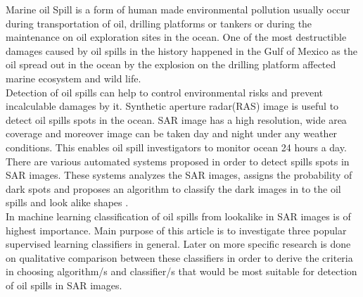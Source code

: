 Marine oil Spill is a form of human made environmental pollution usually occur during transportation of oil, drilling platforms or tankers \cite{Zhang201476}or during the maintenance on oil exploration sites in the ocean. One of the most destructible damages caused by oil spills in the history happened in the Gulf of Mexico as the oil spread out in the ocean by the explosion on the drilling platform affected marine ecosystem and wild life\cite{Bozeman2011244}.\\
Detection of oil spills can help to control environmental risks and prevent incalculable damages by it. Synthetic aperture radar(RAS) image is useful to detect oil spills spots in the ocean. SAR image has a high resolution, wide area coverage and moreover image can be taken day and night under any weather conditions. This enables oil spill investigators to monitor ocean 24 hours a day\cite{Chang20081915}.\\
There are various automated systems proposed in order to detect spills spots in SAR images. These systems analyzes the SAR images, assigns the probability of dark spots and proposes an algorithm to classify the dark images in to the oil spills and look alike shapes \cite{Xu201414,brekke2008classifiers,Keramitsoglou2006640,Guo2014146}.\\
In machine learning classification of oil spills from lookalike in SAR images is of highest importance. Main purpose of this article is to  investigate three popular supervised learning classifiers in general. Later on more specific research is done on qualitative comparison between these classifiers in order to derive the criteria in choosing algorithm/s and classifier/s that would be most suitable for detection of oil spills in SAR images.